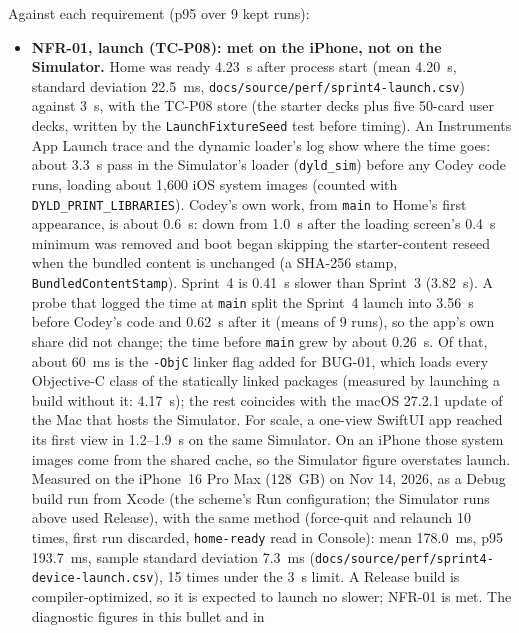 \documentclass[12pt,letterpaper]{article}
\begin{document}
Against each requirement (p95 over 9 kept runs):
\begin{itemize}
  \item \textbf{NFR-01, launch (TC-P08): met on the iPhone, not on the Simulator.} Home was ready
        4.23~s after process start (mean 4.20~s, standard deviation 22.5~ms,
        \texttt{docs/source/perf/sprint4-launch.csv}) against
        3~s, with the TC-P08 store (the starter decks plus five 50-card user decks,
        written by the \texttt{LaunchFixtureSeed} test before timing). An Instruments App Launch trace and the
        dynamic loader's log show where the time goes: about 3.3~s pass in the
        Simulator's loader (\texttt{dyld\_sim}) before any Codey code runs, loading
        about 1{,}600 iOS system images (counted with \texttt{DYLD\_PRINT\_LIBRARIES}).
        Codey's own work, from \texttt{main} to Home's first appearance, is about
        0.6~s: down from 1.0~s after the loading screen's 0.4~s minimum was
        removed and boot began skipping the starter-content reseed when the bundled
        content is unchanged (a SHA-256 stamp, \texttt{BundledContentStamp}).
        Sprint~4 is 0.41~s slower than Sprint~3 (3.82~s). A probe that logged the
        time at \texttt{main} split the Sprint~4 launch into 3.56~s before Codey's
        code and 0.62~s after it (means of 9 runs), so the app's own share did not
        change; the time before \texttt{main} grew by about 0.26~s. Of that,
        about 60~ms is the \texttt{-ObjC} linker flag added for BUG-01, which loads
        every Objective-C class of the statically linked packages (measured by
        launching a build without it: 4.17~s); the rest coincides with the macOS
        27.2.1 update of the Mac that hosts the Simulator. For scale,
        a one-view SwiftUI app reached its first view in 1.2--1.9~s on the same
        Simulator. On an iPhone those system images come from the shared cache, so
        the Simulator figure overstates launch. Measured on the iPhone~16 Pro Max
        (128~GB) on Nov 14, 2026, as a Debug build run from Xcode (the scheme's Run
        configuration; the Simulator runs above used Release), with the same method (force-quit
        and relaunch 10 times, first run discarded, \texttt{home-ready} read in
        Console): mean 178.0~ms, p95 193.7~ms, sample standard deviation 7.3~ms
        (\texttt{docs/source/perf/sprint4-device-launch.csv}), 15 times under the
        3~s limit. A Release build is compiler-optimized, so it is expected to launch no
        slower; NFR-01 is met. The diagnostic figures in this bullet and in

\end{itemize}
\end{document}
